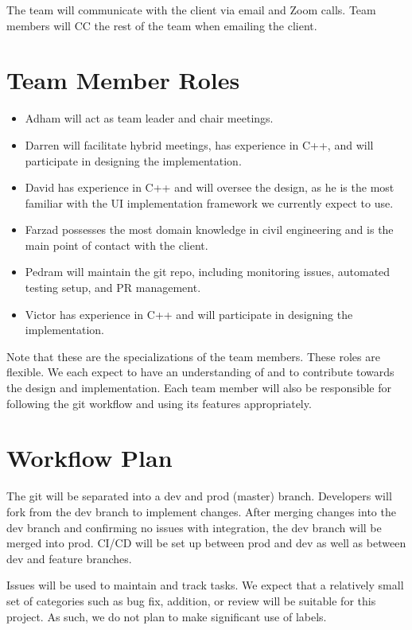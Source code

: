 \documentclass{article}
\begin{document}
The team will communicate with the client via email and Zoom calls. Team members will CC the rest of the team when emailing the client.

\section{Team Member Roles}

\begin{itemize}
	\item Adham will act as team leader and chair meetings.
	\item Darren will facilitate hybrid meetings, has experience in C++, and will participate in designing the implementation.
	\item David has experience in C++ and will oversee the design, as he is the most familiar with the UI implementation framework we currently expect to use.
	\item Farzad possesses the most domain knowledge in civil engineering and is the main point of contact with the client.
	\item Pedram will maintain the git repo, including monitoring issues, automated testing setup, and PR management.
	\item Victor has experience in C++ and will participate in designing the implementation.
\end{itemize}

Note that these are the specializations of the team members. These roles are flexible. We each expect to have an understanding of and to contribute towards the design and implementation. Each team member will also be responsible for following the git workflow and using its features appropriately. 

\section{Workflow Plan}

The git will be separated into a dev and prod (master) branch. Developers will fork from the dev branch to implement changes. After merging changes into the dev branch and confirming no issues with integration, the dev branch will be merged into prod. CI/CD will be set up between prod and dev as well as between dev and feature branches.

Issues will be used to maintain and track tasks. We expect that a relatively small set of categories such as bug fix, addition, or review will be suitable for this project. As such, we do not plan to make significant use of labels.
\end{document}
